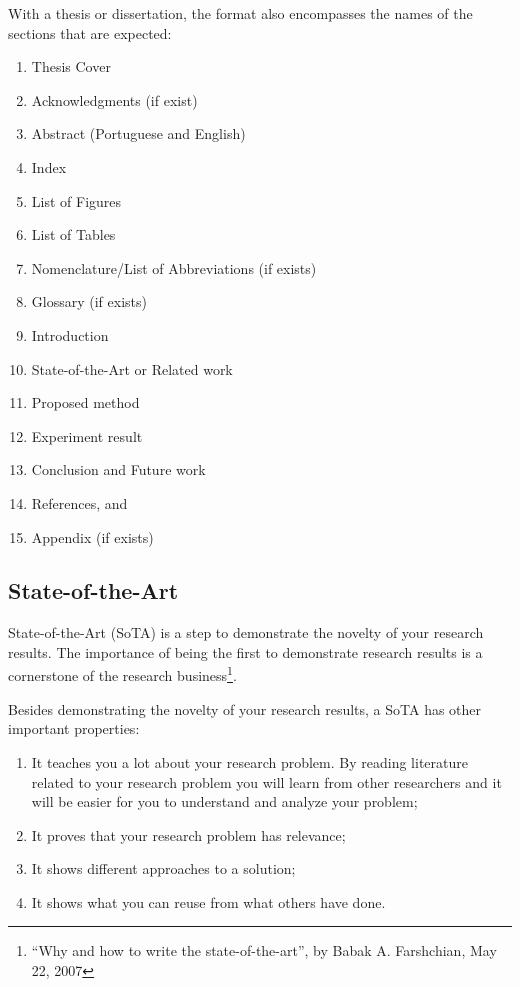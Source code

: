 With a thesis or dissertation, the format also encompasses the names of the sections that are expected: 
\begin{enumerate}
\item Thesis Cover
\item Acknowledgments (if exist)
\item Abstract (Portuguese and English)
\item Index
\item List of Figures
\item List of Tables
\item Nomenclature/List of Abbreviations (if exists)
\item Glossary (if exists)
\item Introduction
\item State-of-the-Art or Related work
\item Proposed method
\item Experiment result
\item Conclusion and Future work
\item References, and 
\item Appendix (if exists)
\end{enumerate}
 
\subsection{State-of-the-Art}
\label{sec:state}

State-of-the-Art (SoTA) is a step to demonstrate the novelty of your research results. The importance of being the first to demonstrate research results is a cornerstone of the research business\footnote{``Why and how to write the state-of-the-art'', by Babak A. Farshchian, May 22, 2007}. 

Besides demonstrating the novelty of your research results, a SoTA has other important properties:
\begin{enumerate}
\item It teaches you a lot about your research problem. By reading literature related to your research problem you will learn from other researchers and it will be easier for you to understand and analyze your problem;
\item It proves that your research problem has relevance;
\item It shows different approaches to a solution;
\item It shows what you can reuse from what others have done. 
\end{enumerate}
 
